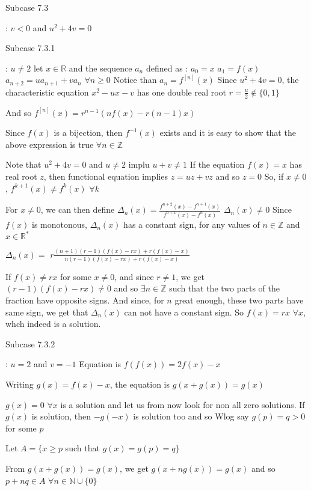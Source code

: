 \begin{solution}
\begin{bolded}Subcase 7.3 \end{bolded}: $v<0$ and $u^2+4v=0$
\begin{bolded}Subcase 7.3.1\end{bolded} : $u\ne 2$
let $x\in\mathbb R$ and the sequence $a_n$ defined as :
$a_0=x$
$a_1=f(x)$
$a_{n+2}=ua_{n+1}+va_n$ $\forall n\ge 0$
Notice than $a_n=f^{[n]}(x)$
Since $u^2+4v=0$, the characteristic equation $x^2-ux-v$ has one double real root $r=\frac u2\notin\{0,1\}$

And so $f^{[n]}(x)=r^{n-1}(nf(x)-r(n-1)x)$

Since $f(x)$ is a bijection, then $f^{-1}(x)$ exists and it is easy to show that the above expression is true $\forall n\in\mathbb Z$

Note that $u^2+4v=0$ and $u\ne 2$ implu $u+v\ne 1$
If the equation $f(x)=x$ has real root $z$, then functional equation implies $z=uz+vz$ and so $z=0$
So, if $x\ne 0$, $f^{k+1}(x)\ne f^k(x)$ $\forall k$

For $x\ne 0$, we can then define $\Delta_n(x)=\frac{f^{n+2}(x)-f^{n+1}(x)}{f^{n+1}(x)-f^{n}(x)}$
$\Delta_n(x)\ne 0$
Since $f(x)$ is monotonous, $\Delta_n(x)$ has a constant sign, for any values of $n\in\mathbb Z$ and $x\in\mathbb R^*$

$\Delta_n(x)=$ $r\frac{(n+1)(r-1)(f(x)-rx)+r(f(x)-x)}{n(r-1)(f(x)-rx)+r(f(x)-x)}$

If $f(x)\ne rx$ for some $x\ne 0$, and since $r\ne 1$, we get $(r-1)(f(x)-rx)\ne 0$ and so $\exists n\in\mathbb Z$ such that the two parts of the fraction have opposite signs.
And since, for $n$ great enough, these two parts have same sign, we get that $\Delta_n(x)$ can not have a constant sign.
So $f(x)=rx$ $\forall x$, whch indeed is a solution.

\begin{bolded}Subcase 7.3.2\end{bolded} : $u=2$ and $v=-1$
Equation is $f(f(x))=2f(x)-x$

Writing $g(x)=f(x)-x$, the equation is $g(x+g(x))=g(x)$

$g(x)=0$ $\forall x$ is a solution and let us from now look for non all zero solutions.
If $g(x)$ is solution, then $-g(-x)$ is solution too and so Wlog say $g(p)=q>0$ for some $p$

Let $A=\{x\ge p$ such that $g(x)=g(p)=q\}$

From $g(x+g(x))=g(x)$, we get $g(x+ng(x))=g(x)$ and so $p+nq\in A$ $\forall n\in\mathbb N\cup\{0\}$


\end{solution}
